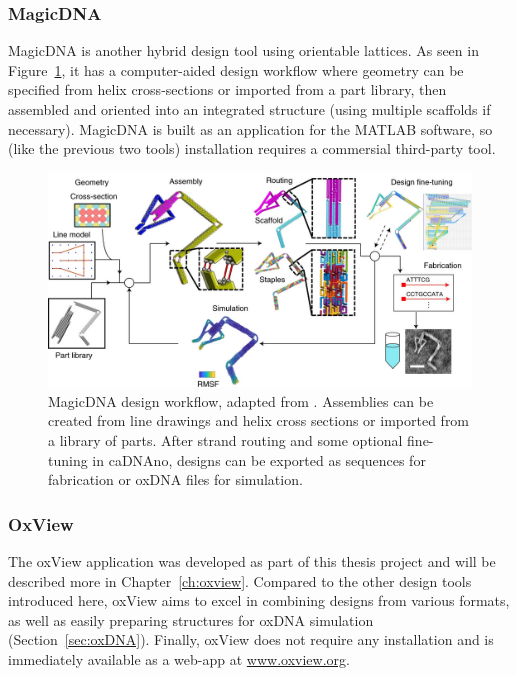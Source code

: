 \subsubsection{MagicDNA}
MagicDNA \cite{huang2021integrated} is another hybrid design tool using orientable lattices. As seen in Figure~\ref{fig:magicDNA}, it has a computer-aided design workflow where geometry can be specified from helix cross-sections or imported from a part library, then assembled and oriented into an integrated structure (using multiple scaffolds if necessary). MagicDNA is built as an application for the MATLAB software, so (like the previous two tools) installation requires a commersial third-party tool.


\begin{figure}[ht]
  \begin{center}
    \includegraphics[width=\textwidth]{figures/magicDNA.jpeg}
    \caption{MagicDNA design workflow, adapted from \cite{huang2021integrated}. Assemblies can be created from line drawings and helix cross sections or imported from a library of parts. After strand routing and some optional fine-tuning in caDNAno, designs can be exported as sequences for fabrication or oxDNA files for simulation.}
    \label{fig:magicDNA}
  \end{center}
\end{figure}

\subsubsection{OxView}
The oxView application \cite{poppleton2020design, bohlin2021design} was developed as part of this thesis project and will be described more in Chapter~\ref{ch:oxview}. Compared to the other design tools introduced here, oxView aims to excel in combining designs from various formats, as well as easily preparing structures for oxDNA simulation (Section~\ref{sec:oxDNA}). Finally, oxView does not require any installation and is immediately available as a web-app at \url{www.oxview.org}.


